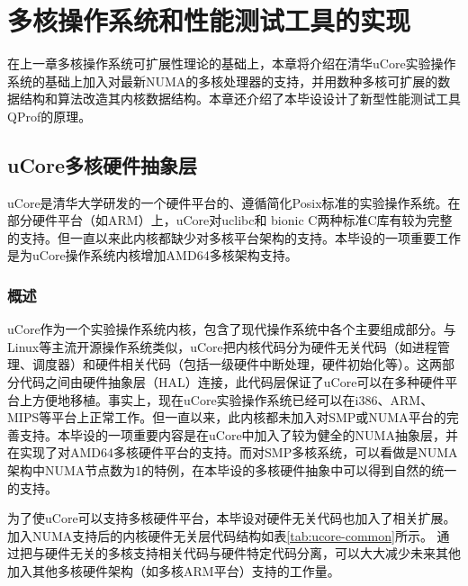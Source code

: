 
\chapter{多核操作系统和性能测试工具的实现}
在上一章多核操作系统可扩展性理论的基础上，本章将介绍在清华uCore实验操作系统的基础上加入对最新NUMA的多核处理器的支持，并用数种多核可扩展的数据结构和算法改造其内核数据结构。本章还介绍了本毕设设计了新型性能测试工具QProf的原理。

\section{uCore多核硬件抽象层}
uCore是清华大学研发的一个硬件平台的、遵循简化Posix标准的实验操作系统。在部分硬件平台（如ARM）上，uCore对uclibc和
bionic
C两种标准C库有较为完整的支持。但一直以来此内核都缺少对多核平台架构的支持。本毕设的一项重要工作是为uCore操作系统内核增加AMD64多核架构支持。

\subsection{概述}
uCore作为一个实验操作系统内核，包含了现代操作系统中各个主要组成部分。与Linux等主流开源操作系统类似，uCore把内核代码分为硬件无关代码（如进程管理、调度器）和硬件相关代码（包括一级硬件中断处理，硬件初始化等）。这两部分代码之间由硬件抽象层（HAL）连接，此代码层保证了uCore可以在多种硬件平台上方便地移植。事实上，现在uCore实验操作系统已经可以在i386、ARM、MIPS等平台上正常工作。但一直以来，此内核都未加入对SMP或NUMA平台的完善支持。本毕设的一项重要内容是在uCore中加入了较为健全的NUMA抽象层，并在实现了对AMD64多核硬件平台的支持。而对SMP多核系统，可以看做是NUMA架构中NUMA节点数为1的特例，在本毕设的多核硬件抽象中可以得到自然的统一的支持。

为了使uCore可以支持多核硬件平台，本毕设对硬件无关代码也加入了相关扩展。加入NUMA支持后的内核硬件无关层代码结构如表\ref{tab:ucore-common}所示。
通过把与硬件无关的多核支持相关代码与硬件特定代码分离，可以大大减少未来其他加入其他多核硬件架构（如多核ARM平台）支持的工作量。

